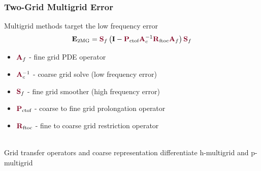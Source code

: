 \documentclass{beamer}
\begin{document}
\begin{frame}
\begin{center}
\frametitle{Two-Grid Multigrid Error}

Multigrid methods target the low frequency error\\

\begin{equation}
\mathbf{E}_{\text{2MG}} = {\color{burgundy}\mathbf{S}}_f \left( \mathbf{I} - {\color{burgundy}\mathbf{P}}_{\text{ctof}} {\color{burgundy}\mathbf{A}}_c^{-1} {\color{burgundy}\mathbf{R}}_{\text{ftoc}} {\color{burgundy}\mathbf{A}}_f \right) {\color{burgundy}\mathbf{S}}_f
\end{equation}

\begin{itemize}

\item ${\color{burgundy}\mathbf{A}}_f$ - fine grid PDE operator

\item ${\color{burgundy}\mathbf{A}}_c^{-1}$ - coarse grid solve (low frequency error)

\item ${\color{burgundy}\mathbf{S}}_f$ - fine grid smoother (high frequency error)

\item ${\color{burgundy}\mathbf{P}}_{\text{ctof}}$ - coarse to fine grid prolongation operator

\item ${\color{burgundy}\mathbf{R}}_{\text{ftoc}}$ - fine to coarse grid restriction operator

\end{itemize}

~\\

Grid transfer operators and coarse representation differentiate h-multigrid and p-multigrid

\end{center}
\end{frame}

\end{document}
